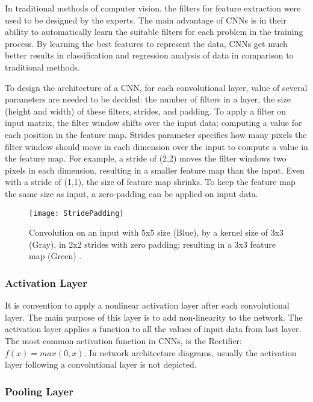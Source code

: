 In traditional methods of computer vision, the filters for feature extraction were used to be designed by the experts. The main advantage of CNNs is in their ability to automatically learn the suitable filters for each problem in the training process. By learning the best features to represent the data, CNNs get much better results in classification and regression analysis of data in comparison to traditional methods. 

To design the architecture of a CNN, for each convolutional layer, value of several parameters are needed to be decided: the number of filters in a layer, the size (height and width) of these filters, strides, and padding. To apply a filter on input matrix, the filter window shifts over the input data; computing a value for each position in the feature map. Strides parameter specifies how many pixels the filter window should move in each dimension over the input to compute a value in the feature map. For example, a stride of (2,2) moves the filter windows two pixels in each dimension, resulting in a smaller feature map than the input. Even with a stride of (1,1), the size of feature map shrinks. To keep the feature map the same size as input, a zero-padding can be applied on input data. 

\begin{figure}
    \centering
    \texttt{[image: StridePadding]}
    \caption{Convolution on an input with 5x5 size (Blue), by a kernel size of 3x3 (Gray), in 2x2 strides with zero padding; resulting in a 3x3 feature map (Green) \cite{stridepadding}.}
    \label{fig:stridepadding}
\end{figure}

\subsubsection{Activation Layer}
It is convention to apply a nonlinear activation layer after each convolutional layer. The main purpose of this layer is to add non-linearity to the network. The activation layer applies a function to all the values of input data from last layer. The most common activation function in CNNs, is the Rectifier: \(f(x) = max(0, x)\). In network architecture diagrams, usually the activation layer following a convolutional layer is not depicted.  

\subsubsection{Pooling Layer} \label{sec:pooling}

